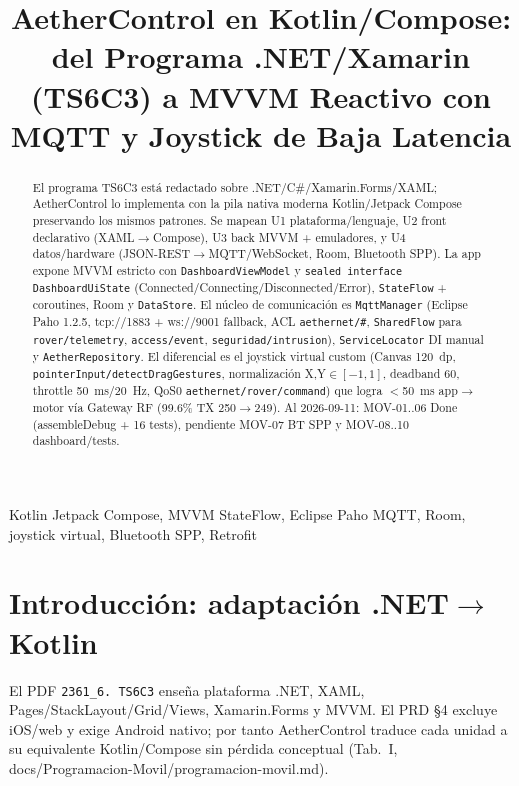 \documentclass[conference]{IEEEtran}
\begin{document}
\title{AetherControl en Kotlin/Compose: del Programa .NET/Xamarin (TS6C3) a MVVM Reactivo con MQTT y Joystick de Baja Latencia}
\author{
\and
{}
}
\maketitle

\begin{abstract}
El programa TS6C3 está redactado sobre .NET/C\#/Xamarin.Forms/XAML; AetherControl lo implementa con la pila nativa moderna Kotlin/Jetpack Compose preservando los mismos patrones. Se mapean U1 plataforma/lenguaje, U2 front declarativo (XAML$\rightarrow$Compose), U3 back MVVM + emuladores, y U4 datos/hardware (JSON-REST$\rightarrow$MQTT/WebSocket, Room, Bluetooth SPP). La app expone MVVM estricto con \texttt{DashboardViewModel} y \texttt{sealed interface DashboardUiState} (Connected/Connecting/Disconnected/Error), \texttt{StateFlow} + coroutines, Room y \texttt{DataStore}. El núcleo de comunicación es \texttt{MqttManager} (Eclipse Paho 1.2.5, tcp://1883 + ws://9001 fallback, ACL \texttt{aethernet/\#}, \texttt{SharedFlow} para \texttt{rover/telemetry}, \texttt{access/event}, \texttt{seguridad/intrusion}), \texttt{ServiceLocator} DI manual y \texttt{AetherRepository}. El diferencial es el joystick virtual custom (Canvas 120~dp, \texttt{pointerInput/detectDragGestures}, normalización X,Y$\in[-1,1]$, deadband 60, throttle 50~ms/20~Hz, QoS0 \texttt{aethernet/rover/command}) que logra $<$50~ms app$\rightarrow$motor vía Gateway RF (99.6\% TX 250$\rightarrow$249). Al 2026-09-11: MOV-01..06 Done (assembleDebug + 16 tests), pendiente MOV-07 BT SPP y MOV-08..10 dashboard/tests.
\end{abstract}
\begin{IEEEkeywords}
Kotlin Jetpack Compose, MVVM StateFlow, Eclipse Paho MQTT, Room, joystick virtual, Bluetooth SPP, Retrofit
\end{IEEEkeywords}

\section{Introducción: adaptación .NET$\rightarrow$Kotlin}
El PDF \texttt{2361\_6. TS6C3} enseña plataforma .NET, XAML, Pages/StackLayout/Grid/Views, Xamarin.Forms y MVVM. El PRD \S4 excluye iOS/web y exige Android nativo; por tanto AetherControl traduce cada unidad a su equivalente Kotlin/Compose sin pérdida conceptual (Tab.~I, docs/Programacion-Movil/programacion-movil.md).
\end{document}
